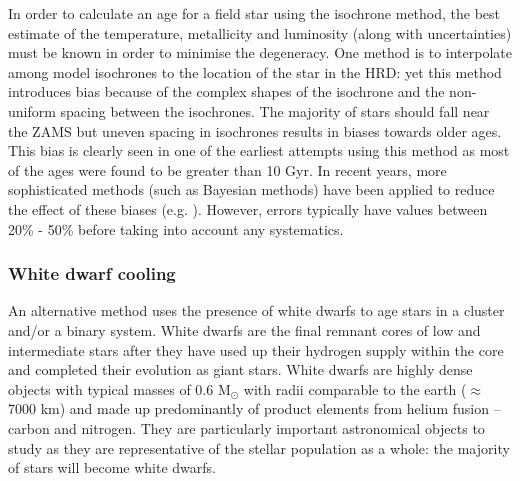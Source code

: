 In order to calculate an age for a field star using the isochrone method, the best estimate of the temperature, metallicity and luminosity (along with uncertainties) must be known in order to minimise the degeneracy. One method is to interpolate among model isochrones to the location of the star in the HRD: yet this method introduces bias because of the complex shapes of the isochrone and the non-uniform spacing between the isochrones. The majority of stars should fall near the ZAMS but uneven spacing in isochrones results in biases towards older ages. This bias is clearly seen in one of the earliest attempts using this method \citep{Perrin_etal_1977} as most of the ages were found to be greater than 10 Gyr. In recent years, more sophisticated methods (such as Bayesian methods) have been applied  to reduce the effect of these biases (e.g. \citealt{Takeda_etal_2007}). However, errors typically have values between 20\% - 50\% before taking into account any systematics.

\subsubsection{White dwarf cooling}
\label{Chp1_WD_cooling_age_method}
An alternative method uses the presence of white dwarfs to age stars in a cluster and/or a binary system. White dwarfs are the final remnant cores of low and intermediate stars after they have used up their hydrogen supply within the core and completed their evolution as giant stars. White dwarfs are highly dense objects with typical masses of 0.6 M$_{\odot}$ with radii comparable to the earth ($\approx$ 7000 km) \citep{Madej_etal_2004} and made up predominantly of product elements from helium fusion -- carbon and nitrogen. They are particularly important astronomical objects to study as they are representative of the stellar population as a whole: the majority of stars will become white dwarfs.

